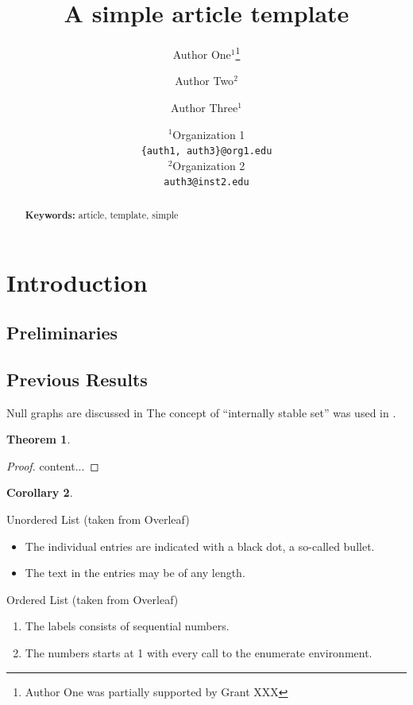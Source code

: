 \documentclass[a4paper]{article}
\title{A simple article template}
\author{Author One$^1$\thanks{Author One was partially supported by Grant XXX} \and Author Two$^2$ \and Author Three$^1$}
\date{
	$^1$Organization 1 \\ \texttt{\{auth1, auth3\}@org1.edu}\\%
	$^2$Organization 2 \\ \texttt{auth3@inst2.edu}\\[2ex]%
}
\theoremstyle{plain}
\newtheorem{theorem}{Theorem}
\newtheorem{corollary}[theorem]{Corollary}
\theoremstyle{definition}
\begin{document}
\linenumbers
\maketitle

\begin{abstract}
	\lipsum[1]

	\noindent\textbf{Keywords:} article, template, simple
\end{abstract}

\tableofcontents

\section{Introduction}
\label{sec:intro}

\lipsum[2]

\subsection{Preliminaries}
\label{sec:pre}

\lipsum[3]

\subsection{Previous Results}
\label{sec:prev-results}

Null graphs are discussed in \cite{HararyR74}
The concept of ``internally stable set'' was used in \cite{Berge57, Berge58}.

\begin{theorem}
	\label{thrm:1}
	\lipsum[4]
\end{theorem}
\begin{proof}
	content...
\end{proof}

\begin{corollary}
	\label{cor:1}

	\lipsum[5]
\end{corollary}

Unordered List (taken from Overleaf)
\begin{itemize}
	\item The individual entries are indicated with a black dot, a so-called bullet.
	\item The text in the entries may be of any length.
\end{itemize}

Ordered List (taken from Overleaf)
\begin{enumerate}
	\item The labels consists of sequential numbers.
	\item The numbers starts at 1 with every call to the enumerate environment.
\end{enumerate}
\end{document}
